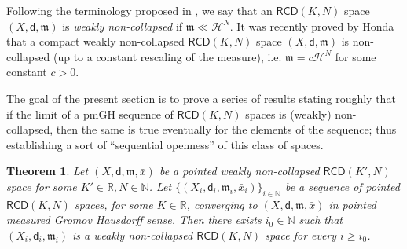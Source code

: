 \documentclass[a4paper]{amsart}
\theoremstyle{plain}
\newtheorem{theorem}[lemma]{Theorem}
\theoremstyle{definition}
\numberwithin{equation}{section}
\newcommand{\R}{\mathbb{R}}
\newcommand{\N}{\mathbb{N}}
\newcommand{\RCD}{\mathsf{RCD}}
\newcommand{\mm}{\mathfrak m}
\newcommand{\sfd}{\mathsf d}
\newcommand{\cH}{\mathcal{H}}
\begin{document}
{{Following the terminology proposed in \cite{GDPNonColl}, we say  that an $\RCD(K,N)$ space $(X,\sfd,\mm)$ is  \emph{weakly non-collapsed} if $\mm\ll \cH^{N}$. It was recently proved by Honda \cite{HondaNC} that a compact weakly non-collapsed $\RCD(K,N)$ space $(X,\sfd,\mm)$ is non-collapsed (up to a constant rescaling of the measure), i.e. $\mm=c \cH^{N}$ for some constant $c>0$. 

The goal of the present section is to prove a series of results stating roughly that if the limit  of a pmGH sequence of $\RCD(K,N)$ spaces is  (weakly) non-collapsed, then the same is true  eventually for the elements of the sequence; thus establishing a sort of ``sequential openness'' of this class of spaces.

\begin{theorem}\label{thm:Stabwnc}
Let $(X,\sfd,\mm, \bar{x})$ be a pointed weakly non-collapsed $\RCD(K',N)$ space for some $K'\in \R, N\in \N$. Let $\{(X_{i}, \sfd_{i},\mm_{i}, \bar{x}_{i})\}_{i\in \N}$ be a sequence of pointed $\RCD(K,N)$ spaces, for some $K\in \R$,  converging to 
$(X,\sfd,\mm, \bar{x})$ in pointed measured Gromov Hausdorff sense. Then there exists $i_{0}\in \N$ such that $(X_{i}, \sfd_{i},\mm_{i})$ is a  weakly non-collapsed $\RCD(K,N)$ space for every $i\geq i_{0}$.
\end{theorem}

}}
\end{document}
